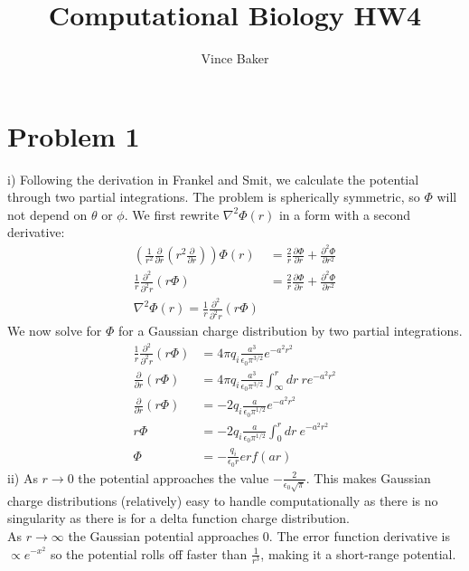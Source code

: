 \documentclass[a4paper,11pt]{article}
\title{Computational Biology HW4}
\author{Vince Baker}
\numberwithin{equation}{section}
\newcommand{\ez}{\epsilon_0}
\newcommand{\lrp}[1]{\left({#1}\right)}
\begin{document}
\maketitle

\section{Problem 1}
i) Following the derivation in Frankel and Smit, we calculate the potential through two partial integrations.
The problem is spherically symmetric, so $\Phi$ will not depend on $\theta$ or $\phi$. 
We first rewrite $\nabla^2\Phi(r)$ in a form with a second derivative:
\begin{align}
 \lrp{\frac{1}{r^2}\frac{\partial }{\partial r}\lrp{r^2\frac{\partial}{\partial r}}}\Phi(r) &= \frac{2}{r}\frac{\partial \Phi}{\partial r}+\frac{\partial^2 \Phi}{\partial r^2} \\
 \frac{1}{r}\frac{\partial^2 }{\partial^2 r}(r\Phi) &= \frac{2}{r}\frac{\partial \Phi}{\partial r}+\frac{\partial^2 \Phi}{\partial r^2}\\
 \nabla^2\Phi(r) = \frac{1}{r}\frac{\partial^2 }{\partial^2 r}(r\Phi)
\end{align}
We now solve for $\Phi$ for a Gaussian charge distribution by two partial integrations.
\begin{align}
 \frac{1}{r}\frac{\partial^2 }{\partial^2 r}(r\Phi) &= 4\pi q_i \frac{a^3}{\ez\pi^{3/2}} e^{-a^2r^2}\\
 \frac{\partial}{\partial r}(r\Phi) &= 4\pi q_i\frac{a^3}{\ez\pi^{3/2}}\int_\infty^r dr\  re^{-a^2r^2}\\
 \frac{\partial}{\partial r}(r\Phi) &= -2 q_i\frac{a}{\ez\pi^{1/2}} e^{-a^2r^2}\\
 r\Phi &= -2 q_i\frac{a}{\ez\pi^{1/2}}\int_0^rdr\  e^{-a^2r^2}\\
 \Phi &= -\frac{q_i}{\ez r} erf(ar)
\end{align}
ii) As $r \rightarrow 0$ the potential approaches the value $-\frac{2}{\ez\sqrt{\pi}}$. 
This makes Gaussian charge distributions (relatively) easy to handle computationally as there is no singularity as there is for a delta function charge distribution.
\\
As $r\rightarrow\infty$ the Gaussian potential approaches 0. 
The error function derivative is $\propto e^{-x^2}$ so the potential rolls off faster than $\frac{1}{r^3}$, making it a short-range potential.
\\
\end{document}
